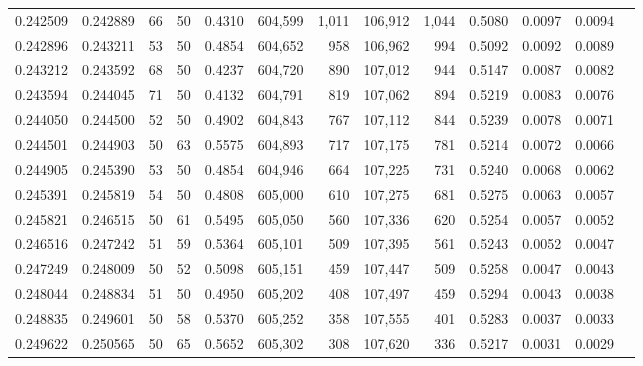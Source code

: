 \begin{tabular}{rrrrrrrrrrrrr}
0.242509 & 0.242889 &    66 &  50 &                                     0.4310 & 604,599 &   1,011 & 106,912 &   1,044 & 0.5080 & 0.0097 & 0.0094 \\
0.242896 & 0.243211 &    53 &  50 &                                     0.4854 & 604,652 &     958 & 106,962 &     994 & 0.5092 & 0.0092 & 0.0089 \\
0.243212 & 0.243592 &    68 &  50 &                                     0.4237 & 604,720 &     890 & 107,012 &     944 & 0.5147 & 0.0087 & 0.0082 \\
0.243594 & 0.244045 &    71 &  50 &                                     0.4132 & 604,791 &     819 & 107,062 &     894 & 0.5219 & 0.0083 & 0.0076 \\
0.244050 & 0.244500 &    52 &  50 &                                     0.4902 & 604,843 &     767 & 107,112 &     844 & 0.5239 & 0.0078 & 0.0071 \\
0.244501 & 0.244903 &    50 &  63 &                                     0.5575 & 604,893 &     717 & 107,175 &     781 & 0.5214 & 0.0072 & 0.0066 \\
0.244905 & 0.245390 &    53 &  50 &                                     0.4854 & 604,946 &     664 & 107,225 &     731 & 0.5240 & 0.0068 & 0.0062 \\
0.245391 & 0.245819 &    54 &  50 &                                     0.4808 & 605,000 &     610 & 107,275 &     681 & 0.5275 & 0.0063 & 0.0057 \\
0.245821 & 0.246515 &    50 &  61 &                                     0.5495 & 605,050 &     560 & 107,336 &     620 & 0.5254 & 0.0057 & 0.0052 \\
0.246516 & 0.247242 &    51 &  59 &                                     0.5364 & 605,101 &     509 & 107,395 &     561 & 0.5243 & 0.0052 & 0.0047 \\
0.247249 & 0.248009 &    50 &  52 &                                     0.5098 & 605,151 &     459 & 107,447 &     509 & 0.5258 & 0.0047 & 0.0043 \\
0.248044 & 0.248834 &    51 &  50 &                                     0.4950 & 605,202 &     408 & 107,497 &     459 & 0.5294 & 0.0043 & 0.0038 \\
0.248835 & 0.249601 &    50 &  58 &                                     0.5370 & 605,252 &     358 & 107,555 &     401 & 0.5283 & 0.0037 & 0.0033 \\
0.249622 & 0.250565 &    50 &  65 &                                     0.5652 & 605,302 &     308 & 107,620 &     336 & 0.5217 & 0.0031 & 0.0029 \\

\end{tabular}
